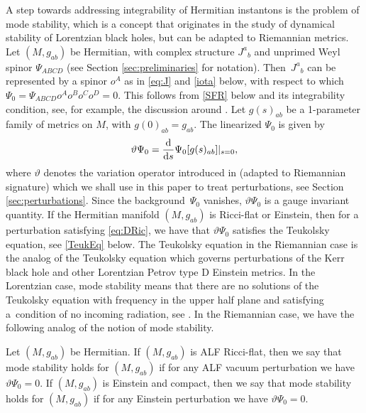 \documentclass[pdftex]{sigma}
\numberwithin{equation}{section}
\begin{document}
A step towards addressing integrability of Hermitian instantons is the problem of mode stability, which is a concept that originates in the study of dynamical stability of Lorentzian black holes, but can be adapted to Riemannian metrics.
Let $(M, g_{ab})$ be Hermitian,
with complex structure $J^{a}{}_{b}$ and unprimed Weyl spinor $\Psi_{ABCD}$ (see Section \ref{sec:preliminaries} for notation).
Then~$J^{a}{}_{b}$ can be represented by a spinor $o^A$ as in \eqref{eq:J} and \eqref{iota} below, with respect to which $\Psi_0=\Psi_{ABCD}o^{A}o^{B}o^{C}o^{D}=0$. This follows from \eqref{SFR} below and its integrability condition, see, for example, the discussion around \cite[equation (12.3)]{Huggett_Tod_1994}.
Let $g(s)_{ab}$ be a 1-parameter family of
metrics on $M$, with $g(0)_{ab} = g_{ab}$.
The linearized $\Psi_0$ is given by
\begin{align} \label{eq:LinPsi0}
\vartheta \Psi_0 = \frac{{\rm d}}{{\rm d}s} \Psi_0[g(s)_{ab}] |_{s=0},
\end{align}
where $\vartheta$ denotes the variation operator introduced in \cite{backdahl2016formalism} (adapted to Riemannian signature) which we shall use in this paper to treat perturbations, see Section \ref{sec:perturbations}. Since the background~$\Psi_0$ vanishes, $\vartheta \Psi_0$ is a gauge invariant quantity.
If the Hermitian manifold $(M,g_{ab})$ is Ricci-flat or Einstein, then for a perturbation satisfying \eqref{eq:DRic}, we have that $\vartheta \Psi_0$ satisfies the Teukolsky equation, see \eqref{TeukEq} below.
The Teukolsky equation in the Riemannian case is the analog of the Teukolsky equation which governs perturbations of the Kerr black hole and other Lorentzian Petrov type D Einstein metrics.
In the Lorentzian case, mode stability means that there are no solutions of the Teukolsky equation with frequency in the upper half plane and satisfying a~condition of no incoming radiation, see \cite{Andersson2016, Whiting}.
In the Riemannian case, we have the following analog of the notion of mode stability.

\begin{Definition} \label{Def:modestability}
Let $(M, g_{ab})$ be Hermitian.
If $(M,g_{ab})$ is ALF Ricci-flat, then we say that mode stability holds for $(M, g_{ab})$ if for any ALF vacuum perturbation we have $\vartheta \Psi_0 = 0$.
If $(M,g_{ab})$ is Einstein and compact, then we say that mode stability holds for $(M, g_{ab})$ if for any Einstein perturbation we have $\vartheta \Psi_0 = 0$.
\end{Definition}
\end{document}
